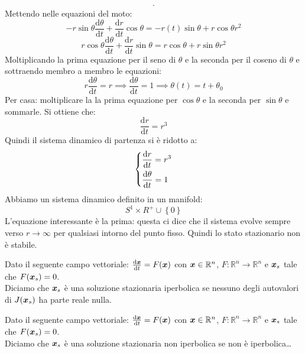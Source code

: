 \begin{exmp}
\[\begin{aligned}
    .\end{aligned}\]
    Mettendo nelle equazioni del moto:
    \[
	-r\sin\theta  \frac{\text{d} \theta}{\text{d} t} + \frac{\text{d} r}{\text{d} t} \cos\theta  = 
	    - r(t)\sin\theta  + r\cos\theta r^2
    \] 
    \[
        r\cos\theta  \frac{\text{d} \theta}{\text{d} t} + \frac{\text{d} r}{\text{d} t} \sin\theta  = r\cos\theta  + r \sin\theta r^2
    \] 
    Moltiplicando la prima equazione per il seno di $\theta$ e la seconda per il coseno di $\theta$ e sottraendo membro a membro le equazioni:
    \[
	r \frac{\text{d} \theta}{\text{d} t} = r \implies  \frac{\text{d} \theta}{\text{d} t} = 1 \implies  \theta (t)=t + \theta_0
    \] 
    Per casa: moltiplicare la la prima equazione per $\cos\theta$ e la seconda per $\sin\theta$ e sommarle. Si ottiene che:
    \[
        \frac{\text{d} r}{\text{d} t} = r^3
    \] 
    Quindi il sistema dinamico di partenza si è ridotto a:
    \[\begin{dcases}
        \frac{\text{d} r}{\text{d} t} = r^3\\
	\frac{\text{d} \theta}{\text{d} t} =1
    \end{dcases}\] 
    Abbiamo un sistema dinamico definito in un manifold: 
    \[
        S^1 \times R^+ \cup \left\{0\right\}
    \] 
    L'equazione interessante è la prima: questa ci dice che il sistema evolve sempre verso $r \to \infty$ per qualsiasi intorno del punto fisso. Quindi lo stato stazionario non è stabile.
\end{exmp}
\noindent
\begin{defn}
    Dato il seguente campo vettoriale: $\frac{\text{d} \boldsymbol{x}}{\text{d} t} = F(\boldsymbol{x})$ con $\boldsymbol{x}\in\mathbb{R}^n$, $F:\mathbb{R}^n \to \mathbb{R}^n$ e $\boldsymbol{x}_s$ tale che $F(\boldsymbol{x}_s)=0$.\\
    Diciamo che $\boldsymbol{x}_s$ è una soluzione stazionaria iperbolica se nessuno degli autovalori di $J(\boldsymbol{x}_s)$ ha parte reale nulla.
\end{defn}
\noindent
\begin{defn}
    Dato il seguente campo vettoriale: $\frac{\text{d} \boldsymbol{x}}{\text{d} t} = F(\boldsymbol{x})$ con $\boldsymbol{x}\in\mathbb{R}^n$, $F:\mathbb{R}^n \to \mathbb{R}^n$ e $\boldsymbol{x}_s$ tale che $F(\boldsymbol{x}_s)=0$.\\
    Diciamo che $\boldsymbol{x}_s$ è una soluzione stazionaria non iperbolica se non è iperbolica\ldots
\end{defn}
\noindent
